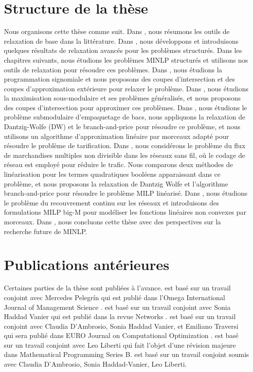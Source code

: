 \section{Structure de la thèse}
Nous organisons cette thèse comme suit. Dans , nous résumons les outils de relaxation de base dans la littérature. Dans , nous développons et introduisons quelques résultats de relaxation avancés pour les problèmes structurés. Dans les chapitres suivants, nous étudions les problèmes MINLP structurés et utilisons nos outils de relaxation pour résoudre ces problèmes. Dans , nous étudions la programmation signomiale et nous proposons des coupes d'intersection et des coupes d'approximation extérieure pour relaxer le problème.  Dans , nous étudions la maximisation sous-modulaire et ses problèmes généralisés, et nous proposons des coupes d'intersection pour approximer ces problèmes.  Dans , nous étudions le problème submodulaire d'empaquetage de bacs, nous appliquons la relaxation de Dantzig-Wolfe (DW) et le branch-and-price pour résoudre ce problème, et nous utilisons un algorithme d'approximation linéaire par morceaux adapté pour résoudre le problème de tarification. Dans , nous considérons le problème du flux de marchandises multiples non divisible dans les réseaux sans fil, où le codage de réseau est employé pour réduire le trafic. Nous comparons deux méthodes de linéarisation pour les termes quadratiques booléens apparaissant dans ce problème, et nous proposons la relaxation de Dantzig Wolfe et l'algorithme branch-and-price pour résoudre le problème MILP linéarisé. Dans , nous étudions le problème du recouvrement continu sur les réseaux et introduisons des formulations MILP big-M pour modéliser les fonctions linéaires non convexes par morceaux.  Dans , nous concluons cette thèse avec des perspectives sur la recherche future de MINLP.
  
\section{Publications antérieures} 

Certaines parties de la thèse sont publiées à l'avance.  est basé sur un travail conjoint avec Mercedes Pelegrín qui est publié dans l'Omega International Journal of Management Science \cite{PELEGRIN2023102835}.   est basé sur un travail conjoint avec Sonia Haddad Vanier qui est publié dans la revue Networks \cite{xu2022branch}.   est basé sur un travail conjoint avec Claudia D'Ambrosio, Sonia Haddad Vanier, et Emiliano Traversi qui sera publié dans EURO Journal on Computational Optimization \cite{xu2022branch}.  est basé sur un travail conjoint avec Leo Liberti qui fait l'objet d'une révision majeure dans Mathematical Programming Series B.  est basé sur un travail conjoint soumis avec Claudia D'Ambrosio, Sonia Haddad-Vanier, Leo Liberti.
